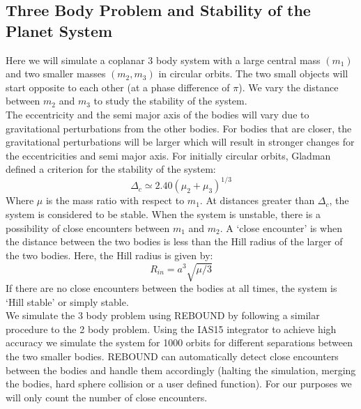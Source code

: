 \documentclass[12pt,a4paper]{article}
\begin{document}
\subsection{Three Body Problem and Stability of the Planet System}
Here we will simulate a coplanar 3 body system with a large central mass $(m_1)$ and two smaller masses $(m_2, m_3)$ in circular orbits. The two small objects will start opposite to each other (at a 
phase difference of $\pi$). We vary the distance  between $m_2$ and $m_3$ to study the stability of the system.\\
The eccentricity and the semi major axis of the bodies will vary due to gravitational perturbations from the other bodies. For bodies that are closer, the gravitational perturbations will be larger which will result in
stronger changes for the eccentricities and semi major axis. For initially circular orbits, Gladman\cite{Gladman} defined a criterion for the stability of the system:
\begin{equation}
  \Delta_c \simeq 2.40(\mu_2+\mu_3)^{1/3}
\end{equation}
Where $\mu$ is the mass ratio with respect to $m_1$. %
At distances greater than $\Delta_c$, the system is considered to be stable. When the system is unstable, there is a possibility of close encounters between $m_1$ and $m_2$. A `close encounter' is when the distance between 
the two bodies is less than the Hill radius of the larger of the two bodies. Here, the Hill radius is given by:
\begin{equation}
  R_{in} = a^3\sqrt{\mu/3}
\end{equation}
If there are no close encounters between the bodies at all times, the system is `Hill stable' or simply stable.\\
We simulate the 3 body problem using REBOUND by following a similar procedure to the 2 body problem. Using the IAS15 integrator to achieve high accuracy we simulate the system for 1000 orbits for different separations 
between the two smaller bodies. REBOUND can automatically detect close encounters between the bodies and handle them accordingly (halting the simulation, merging the bodies, hard sphere collision or a user defined function). 
For our purposes we will only count the number of close encounters.\\
\end{document}
